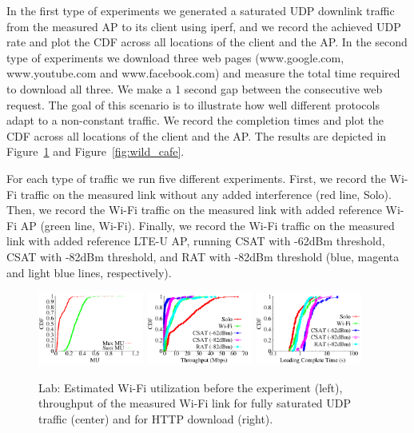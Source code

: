 In the first type of experiments we generated a saturated UDP downlink traffic from the measured AP to its client using iperf, and we record the achieved UDP rate and plot the CDF across all locations of the client and the AP. 
In the second type of experiments we download three web pages (www.google.com, www.youtube.com and www.facebook.com) and measure the total time required to download all three. 
We make a 1 second gap between the consecutive web request. 
The goal of this scenario is to illustrate how well different protocols adapt to a non-constant traffic. 
We record the completion times and plot the CDF across all locations of the client and the AP. 
The results are depicted in Figure~\ref{fig:wild_lab} and Figure~\ref{fig:wild_cafe}.

For each type of traffic we run five different experiments. 
First, we record the Wi-Fi traffic on the measured link without any added interference (red line, Solo).
Then, we record the Wi-Fi traffic on the measured link with added reference Wi-Fi AP (green line, Wi-Fi).
Finally, we record the Wi-Fi traffic on the measured link with added reference LTE-U AP, running CSAT with -62dBm threshold, 
CSAT with -82dBm threshold, and RAT with -82dBm threshold (blue, magenta and light blue lines, respectively).


\begin{figure}[htb!]
 \centering
    \includegraphics[width=0.31\textwidth]{./figures/mu-lab}
    \includegraphics[width=0.31\textwidth]{./figures/office}
    \includegraphics[width=0.31\textwidth]{./figures/officehttp}
    \vspace{-0.3cm}
 \caption{Lab: Estimated Wi-Fi utilization before the experiment (left), throughput of the measured Wi-Fi link for fully saturated UDP traffic (center) and for HTTP download (right).}
  \label{fig:wild_lab}
    \vspace{-0.3cm}
\end{figure}

